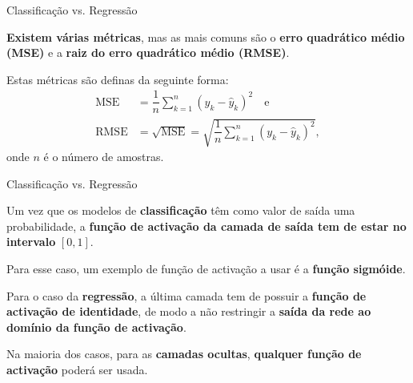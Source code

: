 \begin{frame}{Classificação vs. Regressão \cont}


\bigskip

\textbf{Existem várias métricas}, mas as mais comuns são o \textbf{erro quadrático médio (MSE)} e a \textbf{raiz do erro quadrático médio (RMSE)}.

\pauseskip

Estas métricas são definas da seguinte forma:
\begin{equation}
\begin{split}
    \text{MSE} &= \dfrac{1}{n} \sum_{k=1}^{n} (y_k - \hat{y}_k)^2 \quad \text{e} \\
    \text{RMSE} &= \sqrt{\text{MSE}}  = \sqrt{\dfrac{1}{n} \sum_{k=1}^{n} (y_k - \hat{y}_k)^2},
\end{split}
\end{equation}
onde $n$ é o número de amostras.

\end{frame}

\begin{frame}{Classificação vs. Regressão \cont}

Um vez que os modelos de \textbf{classificação} têm como valor de saída uma probabilidade, a \textbf{função de activação da camada de saída tem de estar no intervalo} $[0, 1]$.

\pauseskip

Para esse caso, um exemplo de função de activação a usar é a \textbf{função sigmóide}. 

\pauseskip

Para o caso da \textbf{regressão}, a última camada tem de possuir a \textbf{função de activação de identidade}, de modo a não restringir a \textbf{saída da rede ao domínio da função de activação}. 

\pauseskip

Na maioria dos casos, para as \textbf{camadas ocultas}, \textbf{qualquer função de activação} poderá ser usada. 

\end{frame}

